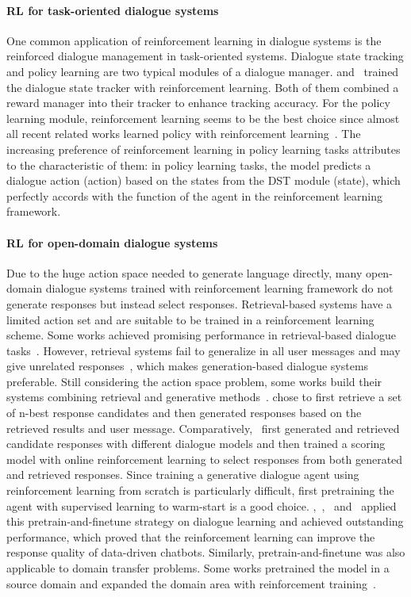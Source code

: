\paragraph*{RL for task-oriented dialogue systems} One common application of reinforcement learning in dialogue systems is the reinforced dialogue management in task-oriented systems. Dialogue state tracking and policy learning are two typical modules of a dialogue manager.  and~ trained the dialogue state tracker with reinforcement learning. Both of them combined a reward manager into their tracker to enhance tracking accuracy. For the policy learning module, reinforcement learning seems to be the best choice since almost all recent related works learned policy with reinforcement learning~. The increasing preference of reinforcement learning in policy learning tasks attributes to the characteristic of them: in policy learning tasks, the model predicts a dialogue action (action) based on the states from the DST module (state), which perfectly accords with the function of the agent in the reinforcement learning framework. 
\paragraph*{RL for open-domain dialogue systems} Due to the huge action space needed to generate language directly, many open-domain dialogue systems trained with reinforcement learning framework do not generate responses but instead select responses. Retrieval-based systems have a limited action set and are suitable to be trained in a reinforcement learning scheme. Some works achieved promising performance in retrieval-based dialogue tasks~. However, retrieval systems fail to generalize in all user messages and may give unrelated responses~, which makes generation-based dialogue systems preferable. Still considering the action space problem, some works build their systems combining retrieval and generative methods~.  chose to first retrieve a set of n-best response candidates and then generated responses based on the retrieved results and user message. Comparatively,~ first generated and retrieved candidate responses with different dialogue models and then trained a scoring model with online reinforcement learning to select responses from both generated and retrieved responses. Since training a generative dialogue agent using reinforcement learning from scratch is particularly difficult, first pretraining the agent with supervised learning to warm-start is a good choice. ,~,~ and~ applied this pretrain-and-finetune strategy on dialogue learning and achieved outstanding performance, which proved that the reinforcement learning can improve the response quality of data-driven chatbots. Similarly, pretrain-and-finetune was also applicable to domain transfer problems. Some works pretrained the model in a source domain and expanded the domain area with reinforcement training~. 
